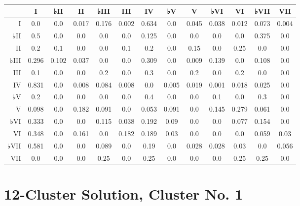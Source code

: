 \begin{table}[htbp]
\begin{minipage}{\linewidth}
\setlength{\tymax}{0.5\linewidth}
\centering
\small
\begin{tabulary}{\textwidth}{@{}RCCCCCCCCCCCC@{}} \toprule
&I&♭II&II&♭III&III&IV&♭V&V&♭VI&VI&♭VII&VII\\
\midrule
I&0.0&0.0&0.017&0.176&0.002&0.634&0.0&0.045&0.038&0.012&0.073&0.004\\
♭II&0.5&0.0&0.0&0.0&0.0&0.125&0.0&0.0&0.0&0.0&0.375&0.0\\
II&0.2&0.1&0.0&0.0&0.1&0.2&0.0&0.15&0.0&0.25&0.0&0.0\\
♭III&0.296&0.102&0.037&0.0&0.0&0.309&0.0&0.009&0.139&0.0&0.108&0.0\\
III&0.1&0.0&0.0&0.2&0.0&0.3&0.0&0.2&0.0&0.2&0.0&0.0\\
IV&0.831&0.0&0.008&0.084&0.008&0.0&0.005&0.019&0.001&0.018&0.025&0.0\\
♭V&0.2&0.0&0.0&0.0&0.0&0.4&0.0&0.0&0.1&0.0&0.3&0.0\\
V&0.098&0.0&0.182&0.091&0.0&0.053&0.091&0.0&0.145&0.279&0.061&0.0\\
♭VI&0.333&0.0&0.0&0.115&0.038&0.192&0.09&0.0&0.0&0.077&0.154&0.0\\
VI&0.348&0.0&0.161&0.0&0.182&0.189&0.03&0.0&0.0&0.0&0.059&0.03\\
♭VII&0.581&0.0&0.0&0.089&0.0&0.19&0.0&0.028&0.028&0.03&0.0&0.056\\
VII&0.0&0.0&0.0&0.25&0.0&0.25&0.0&0.0&0.0&0.25&0.25&0.0\\

\bottomrule

\end{tabulary}
\end{minipage}
\end{table}

\section{12-Cluster Solution, Cluster No. 1}
\label{12-clustersolutionclusterno.1}

